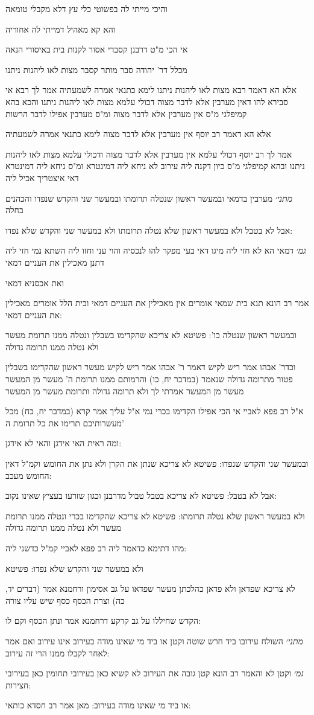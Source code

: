 \documentclass[12pt, openany]{book}
\newcommand{\sethebfont}{
\fontsize{10.5pt}{21.0pt} \selectfont
}
\newcommand{\textblock}[1]{
{\sethebfont #1\\}	
}
\begin{document}
\textblock{והיכי מייתי לה בפשוטי כלי עץ דלא מקבלי טומאה}
\textblock{והא קא מאהיל דמייתי לה אחוריה}
\textblock{אי הכי מ"ט דרבנן קסברי אסור לקנות בית באיסורי הנאה}
\textblock{מכלל דר' יהודה סבר מותר קסבר מצות לאו ליהנות ניתנו}
\textblock{אלא הא דאמר רבא מצות לאו ליהנות ניתנו לימא כתנאי אמרה לשמעתיה אמר לך רבא אי סבירא להו דאין מערבין אלא לדבר מצוה דכולי עלמא מצות לאו ליהנות ניתנו והכא בהא קמיפלגי מ"ס אין מערבין אלא לדבר מצוה ומ"ס מערבין אפילו לדבר הרשות}
\textblock{אלא הא דאמר רב יוסף אין מערבין אלא לדבר מצוה לימא כתנאי אמרה לשמעתיה}
\textblock{אמר לך רב יוסף דכולי עלמא אין מערבין אלא לדבר מצוה ודכולי עלמא מצות לאו ליהנות ניתנו ובהא קמיפלגי מ"ס כיון דקנה ליה עירוב לא ניחא ליה דמינטרא ומ"ס ניחא ליה דמינטרא דאי איצטריך אכיל ליה}
\textblock{{\large\emph{מתני׳}} מערבין בדמאי ובמעשר ראשון שנטלה תרומתו ובמעשר שני והקדש שנפדו והכהנים בחלה}
\textblock{אבל לא בטבל ולא במעשר ראשון שלא נטלה תרומתו ולא במעשר שני והקדש שלא נפדו:}
\textblock{{\large\emph{גמ׳}} דמאי הא לא חזי ליה מיגו דאי בעי מפקר להו לנכסיה והוי עני וחזו ליה השתא נמי חזי ליה דתנן מאכילין את העניים דמאי}
\textblock{ואת אכסניא דמאי}
\textblock{אמר רב הונא תנא בית שמאי אומרים אין מאכילין את העניים דמאי ובית הלל אומרים מאכילין את העניים דמאי:}
\textblock{ובמעשר ראשון שנטלה כו': פשיטא לא צריכא שהקדימו בשבלין ונטלה ממנו תרומת מעשר ולא נטלה ממנו תרומה גדולה}
\textblock{וכדר' אבהו אמר ריש לקיש דאמר ר' אבהו אמר ריש לקיש מעשר ראשון שהקדימו בשבלין פטור מתרומה גדולה שנאמר (במדבר יח, כו) והרמותם ממנו תרומת ה' מעשר מן המעשר מעשר מן המעשר אמרתי לך ולא תרומה גדולה ותרומת מעשר מן המעשר}
\textblock{א"ל רב פפא לאביי אי הכי אפילו הקדימו בכרי נמי א"ל עליך אמר קרא (במדבר יח, כח) מכל מעשרותיכם תרימו את כל תרומת ה'}
\textblock{ומה ראית האי אידגן והאי לא אידגן:}
\textblock{ובמעשר שני והקדש שנפדו: פשיטא לא צריכא שנתן את הקרן ולא נתן את החומש וקמ"ל דאין החומש מעכב:}
\textblock{אבל לא בטבל: פשיטא לא צריכא בטבל טבול מדרבנן וכגון שזרעו בעציץ שאינו נקוב:}
\textblock{ולא במעשר ראשון שלא נטלה תרומתו: פשיטא לא צריכא שהקדימו בכרי ונטלה ממנו תרומת מעשר ולא נטלה ממנו תרומה גדולה}
\textblock{מהו דתימא כדאמר ליה רב פפא לאביי קמ"ל כדשני ליה:}
\textblock{ולא במעשר שני והקדש שלא נפדו: פשיטא}
\textblock{לא צריכא שפדאן ולא פדאן כהלכתן מעשר שפדאו על גב אסימון ורחמנא אמר (דברים יד, כה) וצרת הכסף כסף שיש עליו צורה}
\textblock{הקדש שחיללו על גב קרקע דרחמנא אמר ונתן הכסף וקם לו:}
\textblock{{\large\emph{מתני׳}} השולח עירובו ביד חרש שוטה וקטן או ביד מי שאינו מודה בעירוב אינו עירוב ואם אמר לאחר לקבלו ממנו הרי זה עירוב:}
\textblock{{\large\emph{גמ׳}} וקטן לא והאמר רב הונא קטן גובה את העירוב לא קשיא כאן בעירובי תחומין כאן בעירובי חצירות:}
\textblock{או ביד מי שאינו מודה בעירוב: מאן אמר רב חסדא כותאי:}
\end{document}
